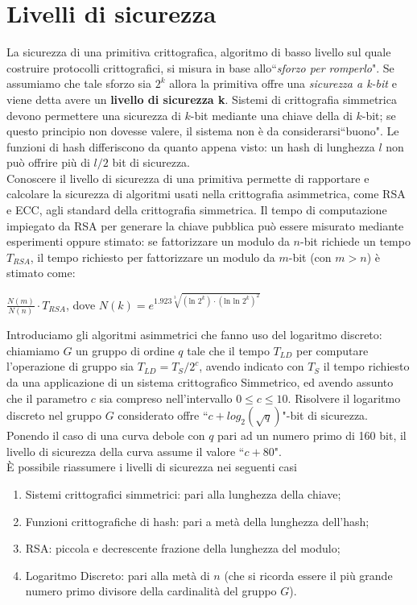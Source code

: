 \documentclass[a4paper,12pt]{tesiinfo}
\newcommand\ddfrac[2]{\frac{\displaystyle #1}{\displaystyle #2}}
\begin{document}
\chapter{Livelli di sicurezza}
La sicurezza di una primitiva crittografica, algoritmo di basso livello sul quale costruire protocolli crittografici, si misura in base allo``\textit{sforzo per romperlo}". Se assumiamo che tale sforzo sia $2^k$ allora la primitiva offre una \textit{sicurezza a k-bit} e viene detta avere un \textbf{livello di sicurezza k}. Sistemi di crittografia simmetrica devono permettere una sicurezza di $k$-bit mediante una chiave della di $k$-bit; se questo principio non dovesse valere, il sistema non \`e da considerarsi``buono". Le funzioni di hash differiscono da quanto appena visto: un hash di lunghezza $l$ non pu\`o offrire pi\`u di $l \big / 2$ bit di sicurezza. 
\\
Conoscere il livello di sicurezza di una primitiva permette di rapportare e calcolare la sicurezza di algoritmi usati nella crittografia asimmetrica, come RSA e ECC, agli standard della crittografia simmetrica. Il tempo di computazione impiegato da RSA per generare la chiave pubblica pu\`o essere misurato mediante esperimenti oppure stimato: se fattorizzare un modulo da $n$-bit richiede un tempo $T_{RSA}$, il tempo richiesto per fattorizzare un modulo da $m$-bit (con $m>n$) \`e stimato come: 
\begin{center}
    $ \ddfrac{N(m)}{N(n)} \cdot T_{RSA}$, dove $N(k) = e^{1.923 \sqrt[3]{( \text{ln }2^k) \cdot ( \text{ln ln }2^k)^{2}}}$
\end{center}
Introduciamo gli algoritmi asimmetrici che fanno uso del logaritmo discreto: chiamiamo $G$ un gruppo di ordine $q$ tale che il tempo $T_{LD}$ per computare l'operazione di gruppo sia $T_{LD} = T_S \big / 2^c$, avendo indicato con $T_S$ il tempo richiesto da una applicazione di un sistema crittografico Simmetrico, ed avendo assunto che il parametro $c$ sia compreso nell'intervallo $0 \leq c \leq 10$. Risolvere il logaritmo discreto nel gruppo $G$ considerato offre ``$c+log_2(\sqrt{q})$"-bit di sicurezza. Ponendo il caso di una curva debole con $q$ pari ad un numero primo di 160 bit, il livello di sicurezza della curva assume il valore ``$c+80$".
\\
\`E possibile riassumere i livelli di sicurezza nei seguenti casi
\begin{enumerate}
    \item Sistemi crittografici simmetrici: pari alla lunghezza della chiave;
    \item Funzioni crittografiche di hash: pari a met\`a della lunghezza dell'hash;
    \item RSA: piccola e decrescente frazione della lunghezza del modulo;
    \item Logaritmo Discreto: pari alla met\`a di $n$ (che si ricorda essere il pi\`u grande numero primo divisore della cardinalit\`a del gruppo $G$).
\end{enumerate}
\end{document}
